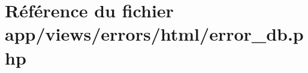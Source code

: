 \hypertarget{html_2error__db_8php}{}\section{Référence du fichier app/views/errors/html/error\+\_\+db.php}
\label{html_2error__db_8php}
